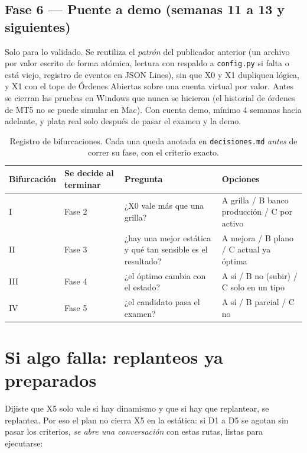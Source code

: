 \documentclass[11pt,a4paper]{article}
\newcommand{\code}[1]{\texttt{\small #1}}
\begin{document}
\subsection{Fase 6 — Puente a demo (semanas 11 a 13 y siguientes)}
Solo para lo validado. Se reutiliza el \emph{patrón} del publicador anterior (un archivo por valor escrito de forma atómica,
lectura con respaldo a \code{config.py} si falta o está viejo, registro de eventos en JSON Lines), sin que X0 y X1 dupliquen
lógica, y X1 con el tope de Órdenes Abiertas sobre una cuenta virtual por valor. Antes se cierran las pruebas en Windows
que nunca se hicieron (el historial de órdenes de MT5 no se puede simular en Mac). Con cuenta demo, mínimo 4 semanas
hacia adelante, y plata real solo después de pasar el examen y la demo.

\begin{table}[H]
\centering\small
\begin{tabularx}{\linewidth}{llXX}
\toprule
Bifurcación & Se decide al terminar & Pregunta & Opciones \\
\midrule
I & Fase 2 & ¿X0 vale más que una grilla? & A grilla / B banco producción / C por activo \\
II & Fase 3 & ¿hay una mejor estática y qué tan sensible es el resultado? & A mejora / B plano / C actual ya óptima \\
III & Fase 4 & ¿el óptimo cambia con el estado? & A sí / B no (subir) / C solo en un tipo \\
IV & Fase 5 & ¿el candidato pasa el examen? & A sí / B parcial / C no \\
\bottomrule
\end{tabularx}
\caption{Registro de bifurcaciones. Cada una queda anotada en \code{decisiones.md} \emph{antes} de correr su fase, con el criterio exacto.}
\end{table}

\section{Si algo falla: replanteos ya preparados}\label{sec:rescate}

Dijiste que X5 solo vale si hay dinamismo y que si hay que replantear, se replantea. Por eso el plan no cierra X5 en la
estática: si D1 a D5 se agotan sin pasar los criterios, \emph{se abre una conversación} con estas rutas, listas para
ejecutarse:
\end{document}
